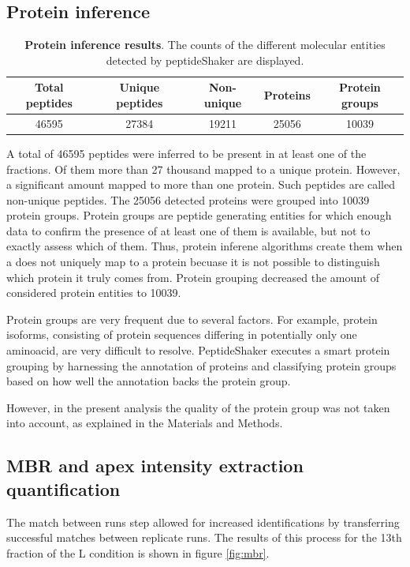 \documentclass[11pt, a4paper]{report}
\begin{document}
\subsection{Protein inference}

\begin{table}[H]
\begin{tabular}{ccccc}
  \toprule
 Total peptides & Unique peptides & Non-unique & Proteins & Protein groups \\ 
  \midrule
 46595 & 27384 & 19211 & 25056 & 10039 \\
 \bottomrule
\end{tabular}
\caption{\textbf{Protein inference results}. The counts of the different molecular entities detected by peptideShaker are displayed.}
\label{tab:quantification_table}
\end{table}

A total of 46595 peptides were inferred to be present in at least one of the fractions. Of them more than 27 thousand mapped to a unique protein. However, a significant amount mapped to more than one protein. Such peptides are called non-unique peptides. The 25056 detected proteins were grouped into 10039 protein groups. Protein groups are peptide generating entities for which enough data to confirm the presence of at least one of them is available, but not to exactly assess which of them. Thus, protein inferene algorithms create them when a does not uniquely map to a protein becuase it is not possible to distinguish which protein it truly comes from. Protein grouping decreased the amount of  considered protein entities to 10039.

Protein groups are very frequent due to several factors. For example, protein isoforms, consisting of protein sequences differing in potentially only one aminoacid, are very difficult to resolve. PeptideShaker executes a smart protein grouping by harnessing the annotation of proteins and classifying protein groups based on how well the annotation backs the protein group.

However, in the present analysis the quality of the protein group was not taken into account, as explained in the Materials and Methods.


\subsection{MBR and apex intensity extraction quantification}

The match between runs step allowed for increased identifications by transferring successful matches between replicate runs. The results of this process for the 13th fraction of the L condition is shown in figure \ref{fig:mbr}.
\end{document}
